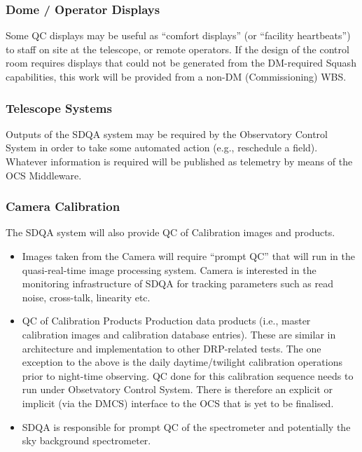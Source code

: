 \documentclass[DM,toc,lsstdraft]{lsstdoc}
\begin{document}
\subsubsection{Dome / Operator Displays}
\label{sec:qaDomeDisplay}

Some QC displays may be useful as ``comfort displays'' (or ``facility heartbeats'') to staff on site at the telescope, or remote operators. If the design of the control room requires displays that could not be generated from the DM-required Squash capabilities, this work will be provided from a non-DM (Commissioning) WBS.

\subsubsection{Telescope Systems}
\label{sec:qaTelescopeSystem}

Outputs of the SDQA system may be required by the Observatory Control System in order to take some automated action (e.g., reschedule a field). Whatever information is required will be published as telemetry by means of the OCS Middleware.

\subsubsection{Camera Calibration}
\label{sec:qaCameraCalibration}

The SDQA system will also provide QC of Calibration images and products.

\begin{itemize}

\item Images taken from the Camera will require ``prompt QC'' that will run in the quasi-real-time image processing system. Camera is interested in the monitoring infrastructure of SDQA for tracking parameters such as read noise, cross-talk, linearity etc.

\item QC of Calibration Products Production data products (i.e., master calibration images and calibration database entries). These are similar in architecture and implementation to other DRP-related tests. The one exception to the above is the daily daytime/twilight calibration operations prior to night-time observing. QC done for this calibration sequence needs to run under Obsetvatory Control System. There is therefore an explicit or implicit (via the DMCS) interface to the OCS that is yet to be finalised.

\item SDQA is responsible for prompt QC of the spectrometer and potentially the sky background spectrometer.

\end{itemize}
\end{document}
